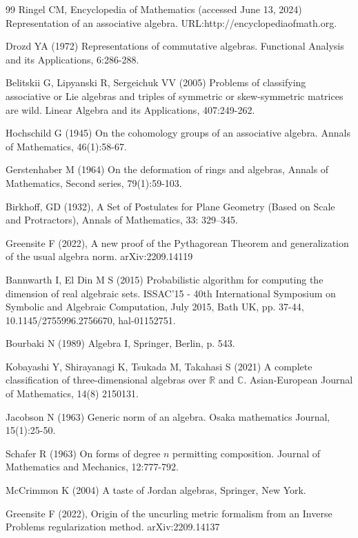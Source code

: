 \documentclass{amsart}
\numberwithin{equation}{section}
\theoremstyle{definition}
\numberwithin{theorem}{section}
\begin{document}
\vspace{.75cm}

   \begin{thebibliography}{99}
 Ringel CM, Encyclopedia of Mathematics (accessed June 13, 2024) Representation of an associative algebra. URL:http://encyclopediaofmath.org.
   
     Drozd YA (1972) Representations of commutative algebras. Functional Analysis and its Applications, 6:286-288.
          
        Belitskii G, Lipyanski R, Sergeichuk VV (2005) Problems of classifying associative or Lie algebras and triples of symmetric or skew-symmetric matrices are wild.  Linear Algebra and its Applications, 407:249-262.
       
        Hochschild G (1945) On the cohomology groups of an associative algebra.  Annals of Mathematics, 46(1):58-67.
       
             Gerstenhaber M (1964) On the deformation of rings and algebras, Annals of Mathematics, Second series, 79(1):59-103.
            
                      Birkhoff, GD (1932), A Set of Postulates for Plane Geometry (Based on Scale and Protractors), Annals of Mathematics, 33: 329–345.
         
                        Greensite F (2022), A new proof of the Pythagorean Theorem and generalization of the usual algebra norm. arXiv:2209.14119

               Bannwarth I, El Din M S (2015) Probabilistic algorithm for computing the dimension of real algebraic sets.  ISSAC'15 - 40th International Symposium on Symbolic and Algebraic Computation, July 2015, Bath UK, pp. 37-44, 10.1145/2755996.2756670, hal-01152751.
              
                  Bourbaki N (1989) Algebra I, Springer, Berlin, p. 543.           
       
               Kobayashi Y, Shirayanagi K, Tsukada M, Takahasi S (2021) A complete classification of three-dimensional algebras over $\mathbb{R}$ and $\mathbb{C}$. Asian-European Journal of Mathematics, 14(8) 2150131.                                        
   
               Jacobson N  (1963) Generic norm of an algebra. Osaka mathematics Journal, 15(1):25-50.
  
          Schafer R (1963) On forms of degree $n$ permitting composition. Journal of Mathematics and Mechanics, 12:777-792. 
         
      
        McCrimmon K (2004) A taste of Jordan algebras, Springer, New York.
       
                            Greensite F (2022), Origin of the uncurling metric formalism from an Inverse Problems regularization method. arXiv:2209.14137

              
      \end{thebibliography}

     
\end{document}
